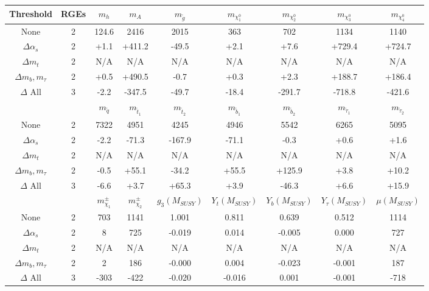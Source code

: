 \begin{table}
\begin{center}
\begin{tabular}{|c|c|ccccccc|}\hline
Threshold & RGEs \vphantom{\bigg[} & $m_h$   & $m_A$   & $m_{\tilde g}$   & $m_{\chi_1^0}$   & $m_{\chi_2^0}$   & $m_{\chi_3^0}$   & $m_{\chi_4^0}$   \\ \hline
None               & 2 & 124.6 & 2416 & 2015 &  363 &  702 & 1134 &1140\\
$\Delta \alpha_s$  & 2 &  +1.1 & +411.2 & -49.5 &  +2.1 &  +7.6 & +729.4 &+724.7\\
$\Delta m_t$      & 2 & N/A & N/A & N/A & N/A & N/A & N/A & N/A  \\
$\Delta m_b, m_\tau$& 2 &  +0.5 & +490.5 &  -0.7 &  +0.3 &  +2.3 & +188.7 &+186.4\\
$\Delta$ All      & 3 &  -2.2 & -347.5 & -49.7 & -18.4 & -291.7 & -718.8 &-421.6\\

%
\hline & \vphantom{\bigg[}  & $m_{{\tilde q}}$  & $m_{{\tilde t}_1}$  & $m_{{\tilde t}_2}$  & $m_{{\tilde b}_1}$  & $m_{{\tilde b}_2}$  & $m_{{\tilde \tau}_1}$  & $m_{{\tilde \tau}_2}$ \\ \hline
None             & 2 &7322 & 4951 & 4245 & 4946 & 5542 & 6265 &5095\\
$\Delta \alpha_s$  & 2 &  -2.2 & -71.3 & -167.9 & -71.1 &  -0.3 &  +0.6 & +1.6\\
$\Delta m_t$      & 2 & N/A & N/A & N/A & N/A & N/A & N/A & N/A \\
$\Delta m_b, m_\tau$& 2 &  -0.5 & +55.1 & -34.2 & +55.5 & +125.9 &  +3.8 &+10.2\\
$\Delta$ All      & 3 &  -6.6 &  +3.7 & +65.3 &  +3.9 & -46.3 &  +6.6 &+15.9\\

%
\hline & \vphantom{\bigg[}  & $m_{\chi_1}^\pm$  & $m_{\chi_2}^\pm$  & $g_3(M_{SUSY})$  & $Y_t(M_{SUSY})$  & $Y_b(M_{SUSY})$  & $Y_\tau(M_{SUSY})$  & $\mu(M_{SUSY})$     \\ \hline
 None                   & 2 &  703 & 1141 & 1.001 & 0.811 & 0.639 & 0.512 & 1114\\
$\Delta \alpha_s$  & 2 &    8 &  725 & -0.019 & 0.014 & -0.005 & 0.000 &  727\\
$\Delta m_t$      & 2 & N/A & N/A & N/A & N/A & N/A & N/A& N/A\\
$\Delta m_b, m_\tau$& 2 &    2 &  186 & -0.000 & 0.004 & -0.023 & -0.001 &  187\\
$\Delta$ All      & 3 & -303 & -422 & -0.020 & -0.016 & 0.001 & -0.001 & -718\\


\end{tabular}
\end{center}
\end{table}
